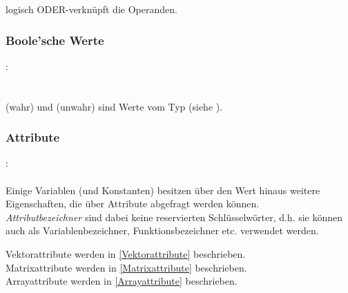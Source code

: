 \op{||} logisch ODER-verknüpft die Operanden.


\subsubsection{Boole'sche Werte}\label{Boole'sche Werte}
:\label{asdr_konst_bool}\\
\hspace*{1cm}\\
\hspace*{1cm}\\

 (wahr) und  (unwahr) sind Werte vom Typ  (siehe ).


\subsubsection{Attribute}\label{Attribute}
:\label{attribut}\\
\hspace*{1cm} \\


Einige Variablen (und Konstanten) besitzen über den Wert hinaus weitere Eigenschaften, die
über Attribute abgefragt werden können. \\
\emph{Attributbezeichner} sind dabei keine reservierten
Schlüsselwörter, d.h. sie können auch als Variablenbezeichner, Funktionsbezeichner etc.
verwendet werden.

\noindent Vektorattribute werden in \ref{Vektorattribute} beschrieben.\\
Matrixattribute werden in \ref{Matrixattribute} beschrieben.\\
Arrayattribute werden in \ref{Arrayattribute} beschrieben.\\


